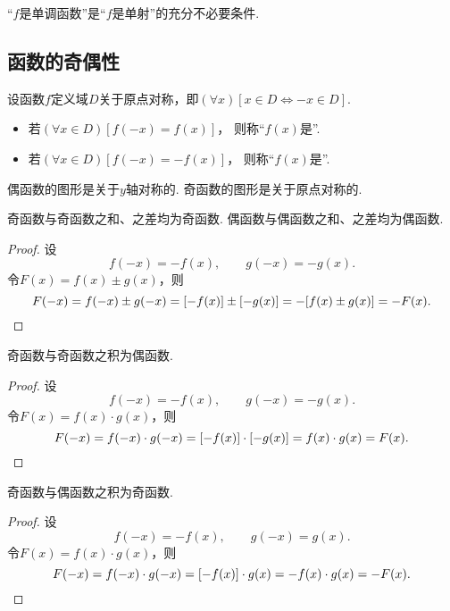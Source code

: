 \begin{proposition}
“\(f\)是单调函数”是“\(f\)是单射”的充分不必要条件.
\end{proposition}

\subsection{函数的奇偶性}
\begin{definition}
设函数\(f\)定义域\(D\)关于原点对称，即\((\forall x)[x \in D \iff -x \in D]\).
\begin{itemize}
	\item 若\((\forall x \in D)
	[f(-x) = f(x)]\)，
	则称“\(f(x)\)是”.

	\item 若\((\forall x \in D)
	[f(-x) = -f(x)]\)，
	则称“\(f(x)\)是”.
\end{itemize}
\end{definition}

\begin{property}
偶函数的图形是关于\(y\)轴对称的.
奇函数的图形是关于原点对称的.
\end{property}

\begin{property}
奇函数与奇函数之和、之差均为奇函数.
偶函数与偶函数之和、之差均为偶函数.
\begin{proof}
设\[
f(-x) = -f(x), \qquad g(-x) = -g(x).
\]令\(F(x) = f(x) \pm g(x)\)，则\[
F(-x) = f(-x) \pm g(-x)
= [-f(x)] \pm [-g(x)]
= -[f(x) \pm g(x)]
= -F(x).
\qedhere
\]
\end{proof}
\end{property}

\begin{property}
奇函数与奇函数之积为偶函数.
\begin{proof}
设\[
f(-x) = -f(x), \qquad g(-x) = -g(x).
\]令\(F(x) = f(x) \cdot g(x)\)，则\[
F(-x) = f(-x) \cdot g(-x)
= [-f(x)] \cdot [-g(x)]
= f(x) \cdot g(x)
= F(x).
\qedhere
\]
\end{proof}
\end{property}

\begin{property}
奇函数与偶函数之积为奇函数.
\begin{proof}
设\[
f(-x) = -f(x), \qquad g(-x) = g(x).
\]令\(F(x) = f(x) \cdot g(x)\)，则\[
F(-x) = f(-x) \cdot g(-x)
= [-f(x)] \cdot g(x)
= - f(x) \cdot g(x)
= - F(x).
\qedhere
\]
\end{proof}
\end{property}

